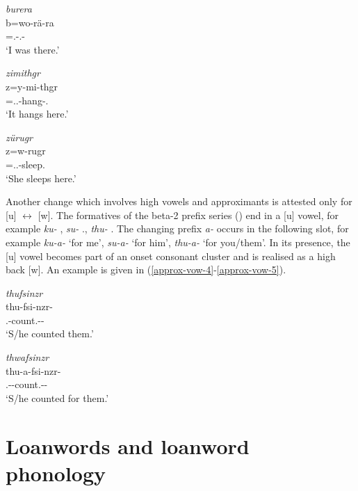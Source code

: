 \begin{exe}
	\ex \emph{burera}\\
	\gll b=wo-rä-ra\\
	\Med{}=\Fsg.\Alph-\Cop.{\Ndu}-\Pst{}\\
	\trans `I was there.'
	\label{approx-vow-2}

\newpage 
	\ex \emph{zimithgr}\\
	\gll z=y-mi-thgr\\
	{\Prox}=\Tsg.\Masc.\Alph-hang-\Stat.{\Ndu}\\
	\trans `It hangs here.'
	\label{approx-vow-3}

	\ex \emph{zürugr}\\
	\gll z=w-rugr\\
	{\Prox}=\Tsg.\F.\Alph-sleep.{\Ndu}\\
	\trans `She sleeps here.'
	\label{approx-vow-1}
\end{exe}

Another change which involves high vowels and approximants is attested only for [u] $\leftrightarrow$ [w]. The formatives of the beta-2 prefix series (\Betatwo) end in a [u] vowel, for example \emph{ku-} \Fsg{}, \emph{su-} \Tsg.\Masc{}, \emph{thu-} \Stnsg{}. The  changing prefix \emph{a-} occurs in the following slot, for example \emph{ku-a-} `for me', \emph{su-a-} `for him', \emph{thu-a-} `for you/them'. In its presence, the [u] vowel becomes part of an onset consonant cluster and is realised as a high back  [w]. An example is given in (\ref{approx-vow-4}-\ref{approx-vow-5}).

\begin{exe}
	\ex \emph{thufsinzr}\\
	\gll thu-fsi-nzr-\Zero{}\\
	\Stnsg{}.\Betatwo{}-count.{\Ext}-{\Ndu}-\Stsg{}\\
	\trans `S/he counted them.'
	\label{approx-vow-4}

	\ex \emph{thwafsinzr}\\
	\gll thu-a-fsi-nzr-\Zero{}\\
	\Stnsg{}.\Betatwo{}-{\Vc}-count.{\Ext}-{\Ndu}-\Stsg{}\\
	\trans `S/he counted for them.'
	\label{approx-vow-5}
\end{exe}

\section{Loanwords and loanword phonology} \label{loanword-phonology}

